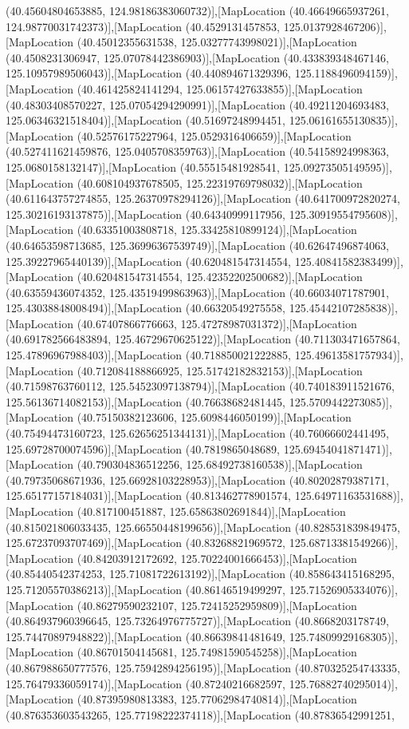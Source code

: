 (40.45604804653885, 124.98186383060732)],[MapLocation (40.46649665937261, 124.98770031742373)],[MapLocation (40.4529131457853, 125.0137928467206)],[MapLocation (40.45012355631538, 125.03277743998021)],[MapLocation (40.4508231306947, 125.07078442386903)],[MapLocation (40.433839348467146, 125.10957989506043)],[MapLocation (40.440894671329396, 125.1188496094159)],[MapLocation (40.461425824141294, 125.06157427633855)],[MapLocation (40.48303408570227, 125.07054294290991)],[MapLocation (40.49211204693483, 125.06346321518404)],[MapLocation (40.51697248994451, 125.06161655130835)],[MapLocation (40.52576175227964, 125.0529316406659)],[MapLocation (40.527411621459876, 125.0405708359763)],[MapLocation (40.54158924998363, 125.0680158132147)],[MapLocation (40.55515481928541, 125.09273505149595)],[MapLocation (40.608104937678505, 125.22319769798032)],[MapLocation (40.611643757274855, 125.26370978294126)],[MapLocation (40.641700972820274, 125.30216193137875)],[MapLocation (40.64340999117956, 125.30919554795608)],[MapLocation (40.63351003808718, 125.33425810899124)],[MapLocation (40.64653598713685, 125.36996367539749)],[MapLocation (40.62647496874063, 125.39227965440139)],[MapLocation (40.620481547314554, 125.40841582383499)],[MapLocation (40.620481547314554, 125.42352202500682)],[MapLocation (40.63559436074352, 125.43519499863963)],[MapLocation (40.66034071787901, 125.43038848008494)],[MapLocation (40.66320549275558, 125.45442107285838)],[MapLocation (40.67407866776663, 125.47278987031372)],[MapLocation (40.691782566483894, 125.46729670625122)],[MapLocation (40.711303471657864, 125.47896967988403)],[MapLocation (40.718850021222885, 125.49613581757934)],[MapLocation (40.712084188866925, 125.51742182832153)],[MapLocation (40.71598763760112, 125.54523097138794)],[MapLocation (40.740183911521676, 125.56136714082153)],[MapLocation (40.76638682481445, 125.5709442273085)],[MapLocation (40.75150382123606, 125.6098446050199)],[MapLocation (40.75494473160723, 125.62656251344131)],[MapLocation (40.76066602441495, 125.69728700074596)],[MapLocation (40.7819865048689, 125.69454041871471)],[MapLocation (40.790304836512256, 125.68492738160538)],[MapLocation (40.79735068671936, 125.66928103228953)],[MapLocation (40.80202879387171, 125.65177157184031)],[MapLocation (40.813462778901574, 125.64971163531688)],[MapLocation (40.817100451887, 125.65863802691844)],[MapLocation (40.815021806033435, 125.66550448199656)],[MapLocation (40.828531839849475, 125.67237093707469)],[MapLocation (40.83268821969572, 125.68713381549266)],[MapLocation (40.84203912172692, 125.70224001666453)],[MapLocation (40.85440542374253, 125.71081722613192)],[MapLocation (40.858643415168295, 125.71205570386213)],[MapLocation (40.86146519499297, 125.71526905334076)],[MapLocation (40.86279590232107, 125.72415252959809)],[MapLocation (40.864937960396645, 125.73264976775727)],[MapLocation (40.8668203178749, 125.74470897948822)],[MapLocation (40.86639841481649, 125.74809929168305)],[MapLocation (40.86701504145681, 125.74981590545258)],[MapLocation (40.867988650777576, 125.75942894256195)],[MapLocation (40.870325254743335, 125.76479336059174)],[MapLocation (40.87240216682597, 125.76882740295014)],[MapLocation (40.87395980813383, 125.77062984740814)],[MapLocation (40.876353603543265, 125.77198222374118)],[MapLocation (40.87836542991251, 